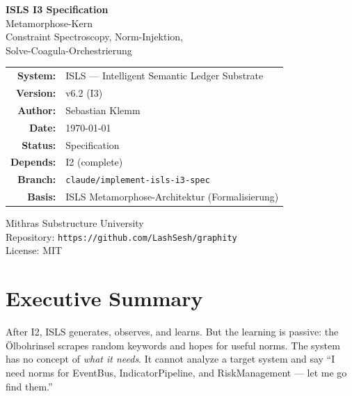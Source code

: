 \documentclass[11pt,a4paper]{article}
\begin{document}
\begin{titlepage}
\centering
\vspace*{2.5cm}

{\Huge\bfseries\color{isls-blue} ISLS I3 Specification}\\[0.5cm]
{\LARGE\color{isls-orange} Metamorphose-Kern}\\[0.3cm]
{\large\color{isls-gray} Constraint Spectroscopy, Norm-Injektion,\\
Solve-Coagula-Orchestrierung}\\[2cm]

{\large
\begin{tabular}{rl}
\textbf{System:}       & ISLS --- Intelligent Semantic Ledger Substrate \\
\textbf{Version:}      & v6.2 (I3) \\
\textbf{Author:}       & Sebastian Klemm \\
\textbf{Date:}         & \today \\
\textbf{Status:}       & Specification \\
\textbf{Depends:}      & I2 (complete) \\
\textbf{Branch:}       & \texttt{claude/implement-isls-i3-spec} \\
\textbf{Basis:}        & ISLS Metamorphose-Architektur (Formalisierung) \\
\end{tabular}
}

\vfill

{\small\color{isls-gray}
Mithras Substructure University\\
Repository: \texttt{https://github.com/LashSesh/graphity}\\
License: MIT
}
\end{titlepage}

\tableofcontents
\newpage


\section{Executive Summary}

After I2, ISLS generates, observes, and learns. But the 
learning is passive: the \"Olbohrinsel scrapes random keywords 
and hopes for useful norms. The system has no concept of 
\emph{what it needs}. It cannot analyze a target system and 
say ``I need norms for EventBus, IndicatorPipeline, and 
RiskManagement --- let me go find them.''
\end{document}
